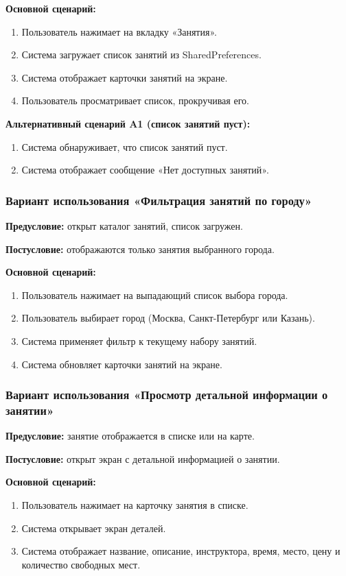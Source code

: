 \textbf{Основной сценарий:}
\begin{enumerate}
	\item Пользователь нажимает на вкладку «Занятия».
	\item Система загружает список занятий из SharedPreferences.
	\item Система отображает карточки занятий на экране.
	\item Пользователь просматривает список, прокручивая его.
\end{enumerate}

\textbf{Альтернативный сценарий A1 (список занятий пуст):}
\begin{enumerate}
	\item Система обнаруживает, что список занятий пуст.
	\item Система отображает сообщение «Нет доступных занятий».
\end{enumerate}

\subsubsection{Вариант использования «Фильтрация занятий по городу»}

\textbf{Предусловие:} открыт каталог занятий, список загружен.

\textbf{Постусловие:} отображаются только занятия выбранного города.

\textbf{Основной сценарий:}
\begin{enumerate}
	\item Пользователь нажимает на выпадающий список выбора города.
	\item Пользователь выбирает город (Москва, Санкт-Петербург или Казань).
	\item Система применяет фильтр к текущему набору занятий.
	\item Система обновляет карточки занятий на экране.
\end{enumerate}

\subsubsection{Вариант использования «Просмотр детальной информации о занятии»}

\textbf{Предусловие:} занятие отображается в списке или на карте.

\textbf{Постусловие:} открыт экран с детальной информацией о занятии.

\textbf{Основной сценарий:}
\begin{enumerate}
	\item Пользователь нажимает на карточку занятия в списке.
	\item Система открывает экран деталей.
	\item Система отображает название, описание, инструктора, время, место, цену и количество свободных мест.
\end{enumerate}

